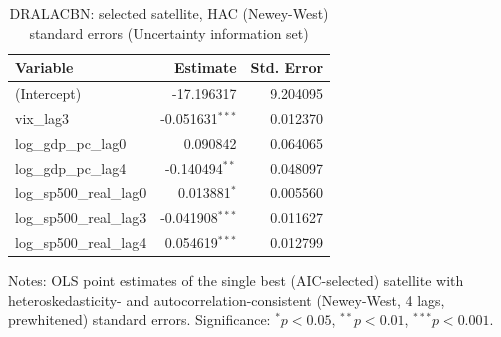\begin{table}[!htbp]
\centering
\caption{DRALACBN: selected satellite, HAC (Newey-West) standard errors (Uncertainty information set)}
\label{tab:dralacbn_uncertainty_satellite_hac}
\begin{tabular}{lrr}
\toprule
Variable & Estimate & Std. Error \\
\midrule
(Intercept) & -17.196317 & 9.204095 \\
vix_lag3 & -0.051631$^{***}$ & 0.012370 \\
log_gdp_pc_lag0 & 0.090842 & 0.064065 \\
log_gdp_pc_lag4 & -0.140494$^{**}$ & 0.048097 \\
log_sp500_real_lag0 & 0.013881$^{*}$ & 0.005560 \\
log_sp500_real_lag3 & -0.041908$^{***}$ & 0.011627 \\
log_sp500_real_lag4 & 0.054619$^{***}$ & 0.012799 \\
\bottomrule
\end{tabular}
\begin{tablenotes}
\small
\item Notes: OLS point estimates of the single best (AIC-selected) satellite with heteroskedasticity- and autocorrelation-consistent (Newey-West, 4 lags, prewhitened) standard errors. Significance: $^{*}p<0.05$, $^{**}p<0.01$, $^{***}p<0.001$.
\end{tablenotes}
\end{table}

